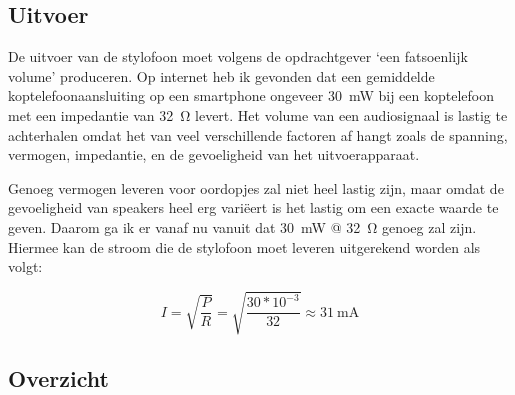 \documentclass[12pt, a4paper, dutch]{article}
\newcommand{\sub}[1]{$_{\text{#1}}$}
\begin{document}
% 

\subsection{Uitvoer}

De uitvoer van de stylofoon moet volgens de opdrachtgever `een fatsoenlijk volume'
produceren. Op internet heb ik gevonden dat een gemiddelde koptelefoonaansluiting op
een smartphone ongeveer \SI{30}{\milli\watt} bij een koptelefoon met een impedantie
van \SI{32}{\ohm} levert. Het volume van een audiosignaal is lastig te achterhalen
omdat het van veel verschillende factoren af hangt zoals de spanning, vermogen,
impedantie, en de gevoeligheid van het uitvoerapparaat.

Genoeg vermogen leveren voor oordopjes zal niet heel lastig zijn, maar omdat de
gevoeligheid van speakers heel erg vari\"eert is het lastig om een exacte waarde te
geven. Daarom ga ik er vanaf nu vanuit dat \SI{30}{\milli\watt} @ \SI{32}{\ohm}
genoeg zal zijn. Hiermee kan de stroom die de stylofoon moet leveren uitgerekend
worden als volgt:

\[
I=\sqrt{\frac{P}{R}} = \sqrt{\frac{30*10^{-3}}{32}} \approx \SI{31}{\milli\ampere}
\]

\subsection{Overzicht}
\end{document}
